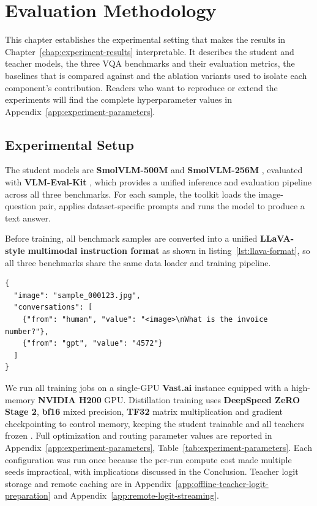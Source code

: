 \chapter{Evaluation Methodology}
\label{chap:evaluation-methodology}

This chapter establishes the experimental setting that makes the results in
Chapter~\ref{chap:experiment-results} interpretable. It describes the student
and teacher models, the three VQA benchmarks and their evaluation metrics,
the baselines that \methodname{} is compared against and the ablation
variants used to isolate each component's contribution. Readers who want to
reproduce or extend the experiments will find the complete hyperparameter
values in Appendix~\ref{app:experiment-parameters}.

\section{Experimental Setup}
The student models are \textbf{SmolVLM-500M} and \textbf{SmolVLM-256M}
\cite{marafioti2025smolvlm}, evaluated with \textbf{VLM-Eval-Kit}
\cite{duan2024vlmevalkit}, which provides a unified inference and evaluation pipeline across all three
benchmarks. For each sample, the toolkit loads the image-question pair, applies
dataset-specific prompts and runs the model to produce a text answer.

Before training, all benchmark samples are converted into a unified
\textbf{LLaVA-style multimodal instruction format}
\cite{liu2023visualinstructiontuning} as shown in listing~\ref{lst:llava-format},
so all three benchmarks share the same data loader and training pipeline.

\begin{lstlisting}[basicstyle=\ttfamily\footnotesize,breaklines=true,frame=single,caption={Representative LLaVA-style sample used after dataset conversion.},label={lst:llava-format}]
{
  "image": "sample_000123.jpg",
  "conversations": [
    {"from": "human", "value": "<image>\nWhat is the invoice number?"},
    {"from": "gpt", "value": "4572"}
  ]
}
\end{lstlisting}

We run all training jobs on a single-GPU \textbf{Vast.ai} instance equipped
with a high-memory \textbf{NVIDIA H200} GPU. Distillation training uses \textbf{DeepSpeed ZeRO Stage 2},
\textbf{bf16} mixed precision, \textbf{TF32} matrix multiplication and
gradient checkpointing to control memory, keeping the student trainable and
all teachers frozen
\cite{rajbhandari2020zero,chen2016sublinear}. Full optimization and routing
parameter values are reported in Appendix~\ref{app:experiment-parameters},
Table~\ref{tab:experiment-parameters}. Each configuration was run once because the per-run compute cost made multiple seeds impractical, with implications discussed in the Conclusion. Teacher logit storage and remote caching are in
Appendix~\ref{app:offline-teacher-logit-preparation} and
Appendix~\ref{app:remote-logit-streaming}.

